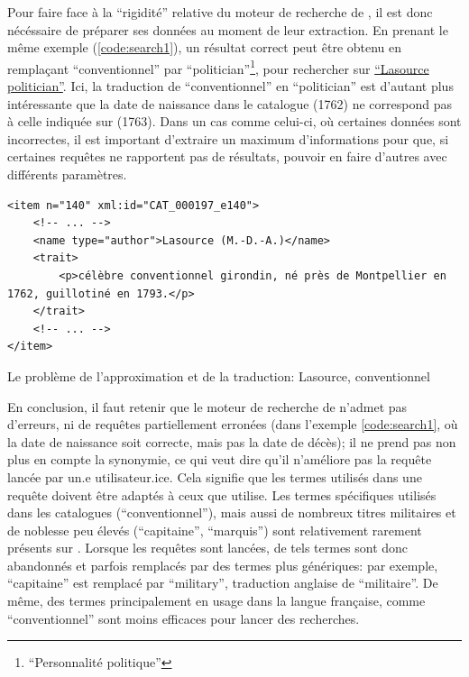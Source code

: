 Pour faire face à la \enquote{rigidité} relative du moteur de recherche de \wkd{}, il est donc nécéssaire de préparer ses données au moment de leur extraction. En prenant le même exemple (\ref{code:search1}), un résultat correct peut être obtenu en remplaçant \enquote{conventionnel} par \enquote{politician}\footnote{\enquote{Personnalité politique}}, pour rechercher sur \wkd{} \href{https://www.wikidata.org/w/index.php?search=lasource+politician&search=lasource+politician&title=Special%3ASearch&go=Go&ns0=1&ns120=1}{\enquote{Lasource politician}}. Ici, la traduction de \enquote{conventionnel} en \enquote{politician} est d'autant plus intéressante que la date de naissance dans le catalogue (1762) ne correspond pas à celle indiquée sur \wkd{} (1763). Dans un cas comme celui-ci, où certaines données sont incorrectes, il est important d'extraire un maximum d'informations pour que, si certaines requêtes ne rapportent pas de résultats, pouvoir en faire d'autres avec différents paramètres.

\begin{listing}
	\begin{verbatim}
<item n="140" xml:id="CAT_000197_e140">
	<!-- ... -->
	<name type="author">Lasource (M.-D.-A.)</name>
	<trait>
		<p>célèbre conventionnel girondin, né près de Montpellier en 1762, guillotiné en 1793.</p>
	</trait>
	<!-- ... -->
</item>	
	\end{verbatim}
	\caption{Le problème de l'approximation et de la traduction: Lasource, conventionnel}
	\label{code:search1}
\end{listing}

En conclusion, il faut retenir que le moteur de recherche de \wkd{} n'admet pas d'erreurs, ni de requêtes partiellement erronées (dans l'exemple \ref{code:search1}, où la date de naissance soit correcte, mais pas la date de décès); il ne prend pas non plus en compte la synonymie, ce qui veut dire qu'il n'améliore pas la requête lancée par un.e utilisateur.ice. Cela signifie que les termes utilisés dans une requête doivent être adaptés à ceux que \wkd{} utilise. Les termes spécifiques utilisés dans les catalogues (\enquote{conventionnel}), mais aussi de nombreux titres militaires et de noblesse peu élevés (\enquote{capitaine}, \enquote{marquis}) sont relativement rarement présents sur \wkd{}. Lorsque les requêtes sont lancées, de tels termes sont donc abandonnés et parfois remplacés par des termes plus génériques: par exemple, \enquote{capitaine} est remplacé par \enquote{military}, traduction anglaise de \enquote{militaire}. De même, des termes principalement en usage dans la langue française, comme \enquote{conventionnel} sont moins efficaces pour lancer des recherches.

